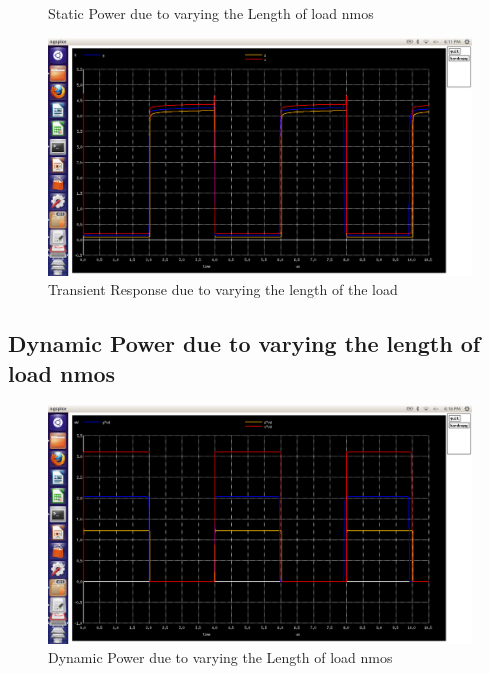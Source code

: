 \documentclass[12pt,a4paper]{article}
\begin{document}
\begin{center}
\begin{figure}[!ht]
\caption[Short]{Static Power due to varying the Length of load nmos}
\end{figure}

\begin{figure}[!ht]
\centering
\includegraphics[scale=0.37]{lab4_pic4_5_3_transient_dueto_varing_Lof_loadnmos.png}

\caption[Short]{Transient Response due to varying the length of the load}
\end{figure}

\subsection{Dynamic Power due to varying the length of load nmos}
\begin{figure}[!ht]
\centering
\includegraphics[scale=0.37]{lab4_pic4_5_4_dynamic_power_dueto_varing_Lof_loadnmos.png}

\caption[Short]{Dynamic Power due to varying the Length of load nmos}
\end{figure}


\end{center}
\end{document}
